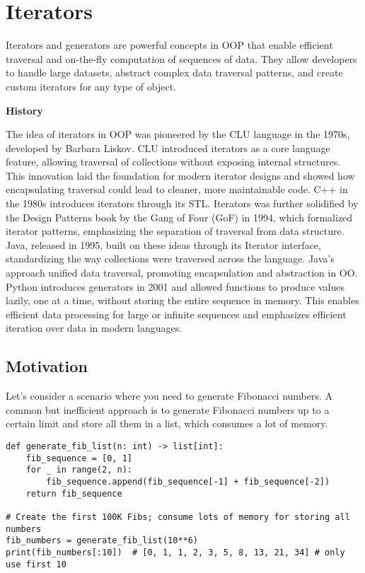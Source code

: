\documentclass[oneside,11pt,dvipsnames]{book}
\newenvironment{historybox}[1][]{
  \small
  \begin{myhistorybox}
    {\small \textbf{#1}}
  }{
  \end{myhistorybox}
}
\begin{document}
\chapter{Iterators}\label{chap:iterators}
Iterators and generators are powerful concepts in OOP that enable efficient traversal and on-the-fly computation of sequences of data. They allow developers to handle large datasets, abstract complex data traversal patterns, and create custom iterators for any type of object. 

\begin{historybox}[History]
    The idea of iterators in OOP was pioneered by the CLU language in the 1970s, developed by Barbara Liskov. CLU introduced iterators as a core language feature, allowing traversal of collections without exposing internal structures. This innovation laid the foundation for modern iterator designs and showed how encapsulating traversal could lead to cleaner, more maintainable code. C++ in the 1980s introduces iterators through its STL. Iterators was further solidified by the Design Patterns book by the Gang of Four (GoF) in 1994, which formalized iterator patterns, emphasizing the separation of traversal from data structure.\\
    
    Java, released in 1995, built on these ideas through its Iterator interface, standardizing the way collections were traversed across the language. Java's approach unified data traversal, promoting encapsulation and abstraction in OO. Python introduces generators in 2001 and allowed functions to produce values lazily, one at a time, without storing the entire sequence in memory.  This enables efficient data processing for large or infinite sequences and emphasizes efficient iteration over data in modern languages.
\end{historybox}
\section{Motivation}
Let’s consider a scenario where you need to generate Fibonacci numbers. A common but inefficient approach is to generate Fibonacci numbers up to a certain limit and store all them in a list, which consumes a lot of memory.

\begin{lstlisting}
def generate_fib_list(n: int) -> list[int]:
    fib_sequence = [0, 1]
    for _ in range(2, n):
        fib_sequence.append(fib_sequence[-1] + fib_sequence[-2])
    return fib_sequence

# Create the first 100K Fibs; consume lots of memory for storing all numbers
fib_numbers = generate_fib_list(10**6)  
print(fib_numbers[:10])  # [0, 1, 1, 2, 3, 5, 8, 13, 21, 34] # only use first 10
\end{lstlisting}
\end{document}
